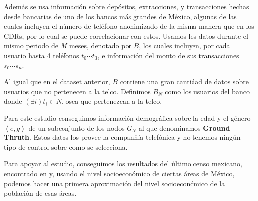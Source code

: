 \documentclass[
11pt,
spanish,
singlespacing, %
parskip, %
headsepline, %
]{MastersDoctoralThesis} %
\begin{document}
Adem\'as se usa informaci\'on sobre dep\'ositos, extracciones, y transacciones hechas desde bancarias de uno de los bancos m\'as grandes de M\'exico, algunas de las cuales incluyen el n\'umero de tel\'efono anonimizado de la misma manera que en los CDRs, por lo cual se puede correlacionar con estos. Usamos los datos durante el mismo periodo de \( M \) meses, denotado por \( B \), los cuales incluyen, por cada usuario hasta 4 tel\'efonos \( t_0 \cdots t_3 \), e informaci\'on del monto de sus transacciones \( s_0 \cdots s_n \).

Al igual que en el dataset anterior, \( B \) contiene una gran cantidad de datos sobre usuarios que no pertenecen a la telco. Definimos \( B_N \) como los usuarios del banco donde \( \left( \exists i \right) t_i \in N \), osea que pertenezcan a la telco.

Para este estudio conseguimos informaci\'on demogr\'afica sobre la edad y el g\'enero \( \left<e, g\right> \) de un subconjunto de los nodos \( G_N \) al que denominamos \textbf{Ground Thruth}. Estos datos los provee la compan\~n\'ia telef\'onica y no tenemos ning\'un tipo de control sobre como se selecciona.

Para apoyar al estudio, conseguimos los resultados del \'ultimo censo mexicano, encontrado en  y, usando el nivel socioecon\'omico de ciertas \'areas de M\'exico, podemos hacer una primera aproximaci\'on del nivel socioecon\'omico de la poblaci\'on de esas \'areas.
\end{document}
